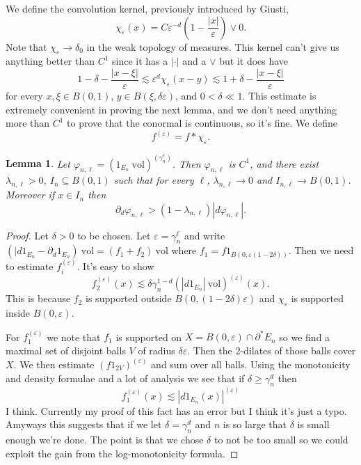 \documentclass[reqno,12pt,letterpaper]{amsart}
\newcommand{\vol}{\mathrm{vol}}
\newtheorem{lemma}[theorem]{Lemma}
\theoremstyle{definition}
\numberwithin{equation}{section}
\begin{document}
We define the convolution kernel, previously introduced by Giusti,
$$\chi_\varepsilon(x) = C\varepsilon^{-d} \left(1 - \frac{|x|}{\varepsilon}\right) \vee 0.$$
Note that $\chi_\varepsilon \to \delta_0$ in the weak topology of measures.
This kernel can't give us anything better than $C^1$ since it has a $|\cdot|$ and a $\vee$ but it does have
$$1 - \delta - \frac{|x - \xi|}{\varepsilon} \lesssim \varepsilon^d \chi_\varepsilon(x - y) \lesssim 1 + \delta - \frac{|x - \xi|}{\varepsilon}$$
for every $x,\xi \in B(0, 1)$, $y \in B(\xi, \delta\varepsilon)$, and $0 < \delta \ll 1$.
This estimate is extremely convenient in proving the next lemma, and we don't need anything more than $C^1$ to prove that the conormal is continuous, so it's fine.
We define
$$f^{(\varepsilon)} = f * \chi_\varepsilon.$$

\begin{lemma}
Let $\varphi_{n,\ell} = (1_{E_n} ~\vol)^{(\gamma_n^\ell)}$.
Then $\varphi_{n,\ell}$ is $C^1$, and there exist $\lambda_{n,\ell} > 0$, $I_n \subseteq B(0, 1)$ such that for every $\ell$, $\lambda_{n,\ell} \to 0$ and $I_{n,\ell} \to B(0, 1)$. Moreover if $x \in I_n$ then
$$\partial_d \varphi_{n, \ell} > (1 - \lambda_{n, \ell})|d\varphi_{n, \ell}|.$$
\end{lemma}
\begin{proof}
Let $\delta > 0$ to be chosen.
Let $\varepsilon = \gamma_n^\ell$ and write $(|d1_{E_n} - \partial_d 1_{E_n}) ~\vol = (f_1 + f_2) ~\vol$ where $f_1 = f1_{B(0, \varepsilon(1-2\delta))}$.
Then we need to estimate $f_i^{(\varepsilon)}$.
It's easy to show
$$f_2^{(\varepsilon)}(x) \lesssim \delta \gamma_n^{1 - d} (|d1_{E_n}| ~\vol)^{(\varepsilon)}(x).$$
This is because $f_2$ is supported outside $B(0, (1-2\delta)\varepsilon)$ and $\chi_\varepsilon$ is supported inside $B(0, \varepsilon)$.

For $f_1^{(\varepsilon)}$ we note that $f_1$ is supported on $X = B(0, \varepsilon) \cap \partial^* E_n$ so we find a maximal set of disjoint balls $V$ of radius $\delta \varepsilon$. Then the $2$-dilates of those balls cover $X$.
We then estimate $(f1_{2V})^{(\varepsilon)}$ and sum over all balls.
Using the monotonicity and density formulae and a lot of analysis we see that if $\delta \geq \gamma_n^d$ then
$$f_1^{(\varepsilon)}(x) \lesssim |d1_{E_n}(x)|^{(\varepsilon)}$$
I think. Currently my proof of this fact has an error but I think it's just a typo.
Amyways this suggests that if we let $\delta = \gamma_n^d$ and $n$ is so large that $\delta$ is small enough we're done.
The point is that we chose $\delta$ to not be too small so we could exploit the gain from the log-monotonicity formula.
\end{proof}
\end{document}
